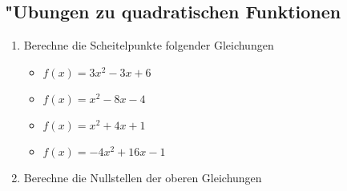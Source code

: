 \subsection{"Ubungen zu quadratischen Funktionen}

\begin{enumerate}
\item Berechne die Scheitelpunkte folgender Gleichungen
\begin{itemize}
\item $f(x) = 3x^2 - 3x + 6$
\item $f(x) = x^2 - 8x - 4$
\item $f(x) = x^2 + 4x + 1$
\item $f(x) = -4x^2 + 16x - 1$
\end{itemize}
\item Berechne die Nullstellen der oberen Gleichungen
\end{enumerate}